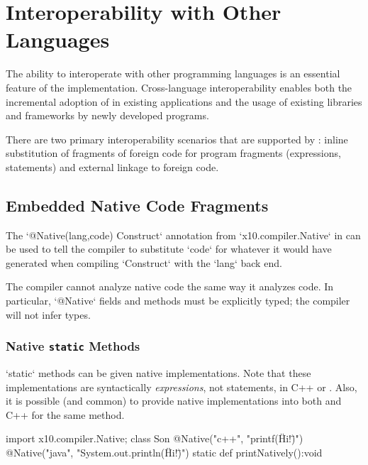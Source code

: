 \chapter{Interoperability with Other Languages}
\label{NativeCode}
\label{Interoperability}

The ability to interoperate with other programming languages is an
essential feature of the \Xten{} implementation.  Cross-language
interoperability enables both the incremental adoption of \Xten{} in
existing applications and the usage of existing libraries and
frameworks by newly developed \Xten{} programs. 

There are two primary interoperability scenarios that are supported by
\XtenCurrVer{}: inline substitution of fragments of foreign code for
\Xten program fragments (expressions, statements) and external linkage
to foreign code.

\section{Embedded Native Code Fragments}

The
\xcd`@Native(lang,code) Construct` annotation from \xcd`x10.compiler.Native` in
\Xten{} can be used to tell the \Xten{} compiler to substitute \xcd`code` for
whatever it would have generated when compiling \xcd`Construct`
with the \xcd`lang` back end.

The compiler cannot analyze native code the same way it analyzes \Xten{} code.  In
particular, \xcd`@Native` fields and methods must be explicitly typed; the
compiler will not infer types.


\subsection{Native {\tt static} Methods}

\xcd`static` methods can be given native implementations.  Note that these
implementations are syntactically {\em expressions}, not statements, in C++ or
\Java{}.   Also, it is possible (and common) to provide native implementations
into both \Java{} and C++ for the same method.
\begin{xten}
import x10.compiler.Native;
class Son {
  @Native("c++", "printf(\"Hi!\")")
  @Native("java", "System.out.println(\"Hi!\")")
  static def printNatively():void {}
}
\end{xten}
%

